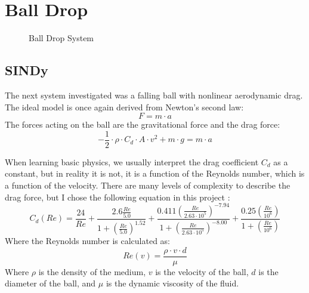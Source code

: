 ﻿\documentclass[12pt,a4paper]{article}
\begin{document}
\section{Ball Drop \cite{BallDropExperiment}}

\begin{figure}[H]
    \centering
    \caption{Ball Drop System}
\end{figure}


\subsection{SINDy}
The next system investigated was a falling ball with nonlinear aerodynamic drag. The ideal
model is once again derived from Newton's second law:
\begin{equation}
    F = m \cdot a
\end{equation}
The forces acting on the ball are the gravitational force and the drag force:
\begin{equation}
    - \frac{1}{2} \cdot \rho \cdot C_d \cdot A \cdot v^2 + m \cdot g = m \cdot a
\end{equation}

When learning basic physics, we usually interpret the drag coefficient $C_d$ as a constant, 
but in reality it is not, it is a function of the Reynolds number, 
which is a function of the velocity. There are many levels of complexity to describe 
the drag force, but I chose the following equation in this project \cite{DragCoefficient}:
\begin{equation}
    C_d(Re) = \frac{24}{Re} + \frac{2.6 \frac{Re}{5.0}}{1 + \left(\frac{Re}{5.0}\right)^{1.52}} + \frac{0.411 \left(\frac{Re}{2.63 \cdot 10^5}\right)^{-7.94}}{1 + \left(\frac{Re}{2.63 \cdot 10^5}\right)^{-8.00}} + \frac{0.25 \left(\frac{Re}{10^6}\right)}{1 + \left(\frac{Re}{10^6}\right)}
\end{equation}
Where the Reynolds number is calculated as:
\begin{equation}
    Re(v) = \frac{\rho \cdot v \cdot d}{\mu}
\end{equation}
Where $\rho$ is the density of the medium, $v$ is the velocity of the ball,
$d$ is the diameter of the ball, and $\mu$ is the dynamic viscosity of the fluid.\par
\end{document}
